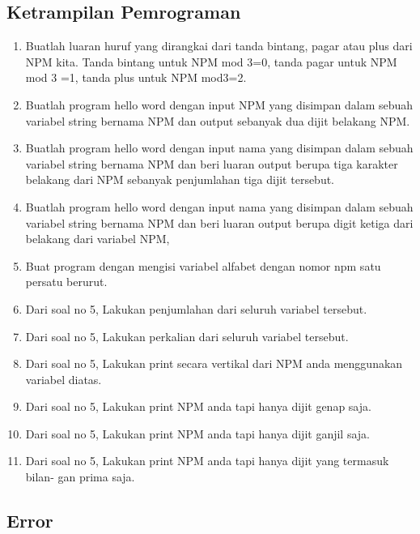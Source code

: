 \subsection{Ketrampilan Pemrograman}
\begin{enumerate}
    \item Buatlah luaran huruf yang dirangkai dari tanda bintang, pagar atau plus dari
    NPM kita. Tanda bintang untuk NPM mod 3=0, tanda pagar untuk NPM mod
    3 =1, tanda plus untuk NPM mod3=2.
    

    \item Buatlah program hello word dengan input NPM yang disimpan dalam sebuah
    variabel string bernama NPM dan output sebanyak dua dijit belakang NPM.
    
    
    \item Buatlah program hello word dengan input nama yang disimpan dalam sebuah
    variabel string bernama NPM dan beri luaran output berupa tiga karakter
    belakang dari NPM sebanyak penjumlahan tiga dijit tersebut.
    

    \item Buatlah program hello word dengan input nama yang disimpan dalam sebuah
    variabel string bernama NPM dan beri luaran output berupa digit ketiga dari
    belakang dari variabel NPM,
    

    \item Buat program dengan mengisi variabel alfabet
    dengan nomor npm satu persatu berurut.
    

    \item Dari soal no 5, Lakukan penjumlahan dari seluruh variabel tersebut.
    

    \item Dari soal no 5, Lakukan perkalian dari seluruh variabel tersebut.
    

    \item Dari soal no 5, Lakukan print secara vertikal dari NPM anda menggunakan
    variabel diatas.
    

    \item Dari soal no 5, Lakukan print NPM anda tapi hanya dijit genap saja.
    

    \item Dari soal no 5, Lakukan print NPM anda tapi hanya dijit ganjil saja.
    

    \item Dari soal no 5, Lakukan print NPM anda tapi hanya dijit yang termasuk bilan-
    gan prima saja.
    

\end{enumerate}
\subsection{Error}
    